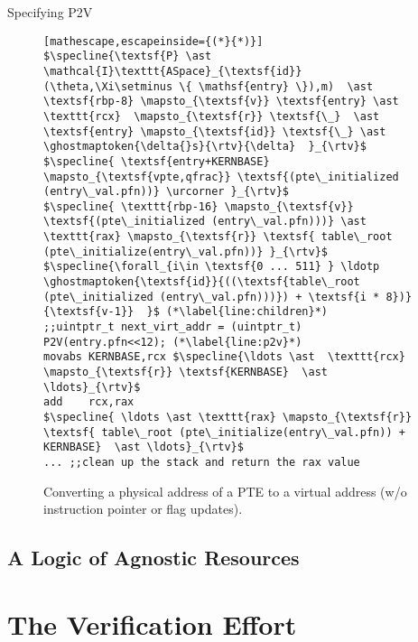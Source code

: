 \documentclass[aspectratio=169,xcolor=dvipsnames]{beamer}
\newcommand{\rtv}{\textsf{rtv}}
\newcommand{\ghostmaptoken}[3]{\ensuremath{#2\hookrightarrow^{#1}#3}}
\newcommand{\specline}[1]{{\color{blue}\left\{#1\right\}}}
\begin{document}
\begin{frame}[fragile]{Specifying \textsf{P2V}}\scriptsize
    \begin{figure}\scriptsize
\begin{lstlisting}[mathescape,escapeinside={(*}{*)}]
$\specline{\textsf{P} \ast \mathcal{I}\texttt{ASpace}_{\textsf{id}}(\theta,\Xi\setminus \{ \mathsf{entry} \}),m)  \ast \textsf{rbp-8} \mapsto_{\textsf{v}} \textsf{entry} \ast \texttt{rcx}  \mapsto_{\textsf{r}} \textsf{\_}  \ast \textsf{entry} \mapsto_{\textsf{id}} \textsf{\_} \ast \ghostmaptoken{\delta{}s}{\rtv}{\delta}  }_{\rtv}$
$\specline{ \textsf{entry+KERNBASE} \mapsto_{\textsf{vpte,qfrac}} \textsf{(pte\_initialized (entry\_val.pfn))} \urcorner }_{\rtv}$
$\specline{ \texttt{rbp-16} \mapsto_{\textsf{v}} \textsf{(pte\_initialized (entry\_val.pfn)))} \ast \texttt{rax} \mapsto_{\textsf{r}} \textsf{ table\_root (pte\_initialize(entry\_val.pfn))} }_{\rtv}$
$\specline{\forall_{i\in \textsf{0 ... 511} } \ldotp  \ghostmaptoken{\textsf{id}}{((\textsf{table\_root (pte\_initialized (entry\_val.pfn)))}) + \textsf{i * 8})}{\textsf{v-1}}  }$ (*\label{line:children}*)
;;uintptr_t next_virt_addr = (uintptr_t) P2V(entry.pfn<<12); (*\label{line:p2v}*) 
movabs KERNBASE,rcx $\specline{\ldots \ast  \texttt{rcx}  \mapsto_{\textsf{r}} \textsf{KERNBASE}  \ast \ldots}_{\rtv}$
add    rcx,rax
$\specline{ \ldots \ast \texttt{rax} \mapsto_{\textsf{r}} \textsf{ table\_root (pte\_initialize(entry\_val.pfn)) + KERNBASE}  \ast \ldots}_{\rtv}$
... ;;clean up the stack and return the rax value
\end{lstlisting}
\caption{Converting a physical address of a PTE to a virtual address (w/o instruction pointer or flag updates).}
\label{fig:p2v}
\end{figure}
\end{frame}
\subsection{A Logic of Agnostic Resources}
\section{The Verification Effort}
\end{document}
